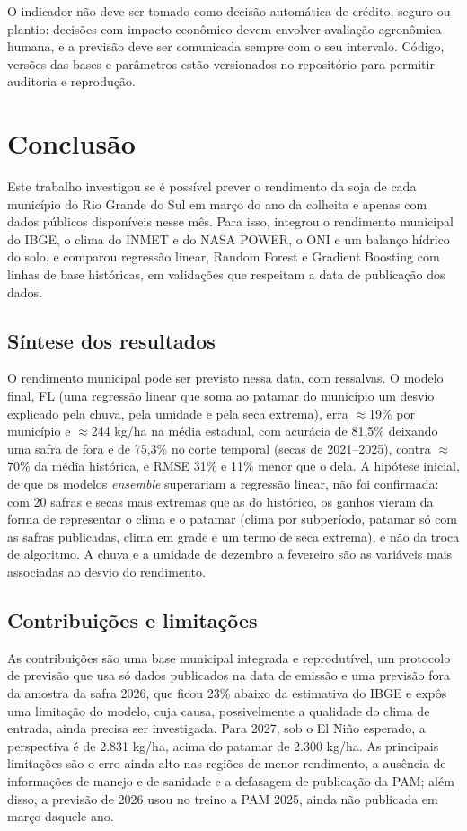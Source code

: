\documentclass[
	article,			%
	11pt,				%
	oneside,			%
	a4paper,			%
	english,			%
	brazil,				%
	sumario=tradicional
	]{abntex2}
\begin{document}
O indicador não deve ser tomado como decisão automática de crédito, seguro ou plantio: decisões com impacto econômico devem envolver avaliação agronômica humana, e a previsão deve ser comunicada sempre com o seu intervalo. Código, versões das bases e parâmetros estão versionados no repositório para permitir auditoria e reprodução.

\section{Conclusão}\label{sec:conclusao}

Este trabalho investigou se é possível prever o rendimento da soja de cada município do Rio Grande do Sul em março do ano da colheita e apenas com dados públicos disponíveis nesse mês. Para isso, integrou o rendimento municipal do IBGE, o clima do INMET e do NASA POWER, o ONI e um balanço hídrico do solo, e comparou regressão linear, Random Forest e Gradient Boosting com linhas de base históricas, em validações que respeitam a data de publicação dos dados.

\subsection{Síntese dos resultados}

O rendimento municipal pode ser previsto nessa data, com ressalvas. O modelo final, FL (uma regressão linear que soma ao patamar do município um desvio explicado pela chuva, pela umidade e pela seca extrema), erra $\approx$19\% por município e $\approx$244 kg/ha na média estadual, com acurácia de 81,5\% deixando uma safra de fora e de 75,3\% no corte temporal (secas de 2021--2025), contra $\approx$70\% da média histórica, e RMSE 31\% e 11\% menor que o dela. A hipótese inicial, de que os modelos \emph{ensemble} superariam a regressão linear, não foi confirmada: com 20 safras e secas mais extremas que as do histórico, os ganhos vieram da forma de representar o clima e o patamar (clima por subperíodo, patamar só com as safras publicadas, clima em grade e um termo de seca extrema), e não da troca de algoritmo. A chuva e a umidade de dezembro a fevereiro são as variáveis mais associadas ao desvio do rendimento.

\subsection{Contribuições e limitações}

As contribuições são uma base municipal integrada e reprodutível, um protocolo de previsão que usa só dados publicados na data de emissão e uma previsão fora da amostra da safra 2026, que ficou 23\% abaixo da estimativa do IBGE e expôs uma limitação do modelo, cuja causa, possivelmente a qualidade do clima de entrada, ainda precisa ser investigada. Para 2027, sob o El Niño esperado, a perspectiva é de 2.831 kg/ha, acima do patamar de 2.300 kg/ha. As principais limitações são o erro ainda alto nas regiões de menor rendimento, a ausência de informações de manejo e de sanidade e a defasagem de publicação da PAM; além disso, a previsão de 2026 usou no treino a PAM 2025, ainda não publicada em março daquele ano.
\end{document}
